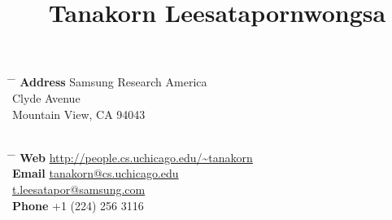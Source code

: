 \documentclass[10pt]{article} %
\begin{document}

\title{Tanakorn Leesatapornwongsa} %


\parbox{0.4\textwidth}{ %
\begin{tabbing} %
\hspace{1.5cm} \= \hspace{2cm} \= \kill %
{\bf Address} \> Samsung Research America\\ %
 Clyde Avenue \\ %
\> Mountain View, CA 94043 \\ %
\> \\
\end{tabbing}}
\hfill %
\parbox{0.6\textwidth}{ %
\begin{tabbing} %
\hspace{2.3cm} \= \hspace{2cm} \= \kill %
{\bf Web} \> \href{http://people.cs.uchicago.edu/\~tanakorn}{http://people.cs.uchicago.edu/\textasciitilde tanakorn} \\ %
{\bf Email} \> \href{mailto:tanakorn@cs.uchicago.edu}{tanakorn@cs.uchicago.edu} \\ %
\> \href{mailto:t.leesatapor@samsung.com}{t.leesatapor@samsung.com} \\
{\bf Phone} \> +1 (224) 256 3116 \\ %
\end{tabbing}}


\end{document}
